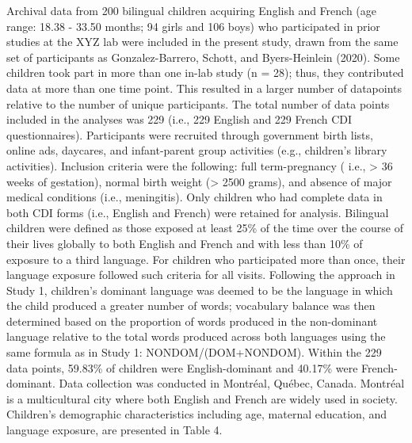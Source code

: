 \documentclass[
  english,
  ,man,floatsintext]{apa6}
\begin{document}
Archival data from 200 bilingual children acquiring English and French (age range: 18.38 - 33.50 months; 94 girls and 106 boys) who participated in prior studies at the XYZ lab were included in the present study, drawn from the same set of participants as Gonzalez-Barrero, Schott, and Byers-Heinlein (2020). Some children took part in more than one in-lab study (n = 28); thus, they contributed data at more than one time point. This resulted in a larger number of datapoints relative to the number of unique participants. The total number of data points included in the analyses was 229 (i.e., 229 English and 229 French CDI questionnaires). Participants were recruited through government birth lists, online ads, daycares, and infant-parent group activities (e.g., children's library activities). Inclusion criteria were the following: full term-pregnancy ( i.e., \textgreater{} 36 weeks of gestation), normal birth weight (\textgreater{} 2500 grams), and absence of major medical conditions (i.e., meningitis). Only children who had complete data in both CDI forms (i.e., English and French) were retained for analysis. Bilingual children were defined as those exposed at least 25\% of the time over the course of their lives globally to both English and French and with less than 10\% of exposure to a third language. For children who participated more than once, their language exposure followed such criteria for all visits. Following the approach in Study 1, children's dominant language was deemed to be the language in which the child produced a greater number of words; vocabulary balance was then determined based on the proportion of words produced in the non-dominant language relative to the total words produced across both languages using the same formula as in Study 1: NONDOM/(DOM+NONDOM). Within the 229 data points, 59.83\% of children were English-dominant and 40.17\% were French-dominant. Data collection was conducted in Montréal, Québec, Canada. Montréal is a multicultural city where both English and French are widely used in society. Children's demographic characteristics including age, maternal education, and language exposure, are presented in Table 4.

~
\end{document}

